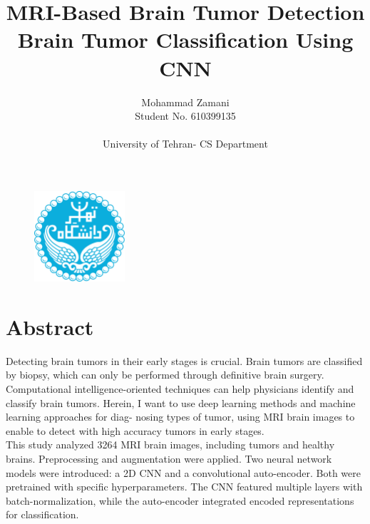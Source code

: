 \documentclass[12pt]{article}
\title{\textbf{\Luge MRI-Based Brain Tumor Detection}\\[1ex]  Brain Tumor Classification Using CNN}
\author{\Large{ Mohammad Zamani}  \\ \Large{Student No. 610399135} \\ \\ \Large{University of Tehran- CS Department}}
\date{}
\begin{document}

	
	\begin{titlingpage}
	
	\begin{figure}
		\centering
		\includegraphics[width=0.3\textwidth]{Figs/University_of_Tehran_logo.png}		
	\end{figure}
		\maketitle
	
	\end{titlingpage}
		
	



	\setlength{\parindent}{20pt}
	\tableofcontents
	
	\vspace{1\baselineskip}

	\pagebreak
	\section{Abstract}

	Detecting brain tumors in their early stages is crucial. Brain tumors are classified by biopsy, which can only be performed through definitive brain surgery. Computational intelligence-oriented techniques can help physicians identify and classify brain tumors. Herein, I want to use deep learning methods and machine learning approaches for diag- nosing types of tumor, using MRI brain images to enable to detect with high accuracy tumors in early stages. \\
	This study analyzed 3264 MRI brain images, including tumors and healthy brains. Preprocessing and augmentation were applied. Two neural network models were introduced: a 2D CNN and a convolutional auto-encoder. Both were pretrained with specific hyperparameters. The CNN featured multiple layers with batch-normalization, while the auto-encoder integrated encoded representations for classification.
\end{document}
